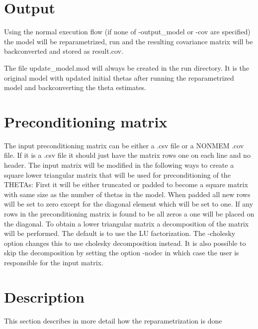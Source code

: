 \section{Output}

Using the normal execution flow (if none of -output\_model or -cov are specified) the model will be reparametrized, run and the resulting covariance matrix will be
backconverted and stored as result.cov.

The file update\_model.mod will always be created in the run directory. It is the original model with updated initial thetas after
running the reparametrized model and backconverting the theta estimates.


\section{Preconditioning matrix}

The input preconditioning matrix can be either a .csv file or a NONMEM .cov file. If it is a .csv file it should just have the matrix
rows one on each line and no header.
The input matrix will be modified in the following ways to create
a square lower triangular matrix that will be used for preconditioning of the THETAs:
First it will be either truncated or padded to become a square matrix with same size as the number of thetas in the model.
When padded all new rows will be set to zero except for the diagonal element which will be set to one. If any rows in the preconditioning matrix is found
to be all zeros a one will be placed on the diagonal. To obtain a lower triangular matrix a decomposition of the matrix will be performed. The default is to
use the LU factorization. The -cholesky option changes this to use cholesky decomposition instead. It is also possible to skip the decomposition by
setting the option -nodec in which case the user is responsible for the input matrix.

\section{Description}

This section describes in more detail how the reparametrization is done

